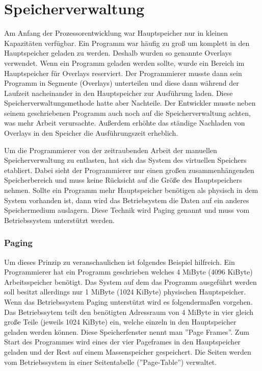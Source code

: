 \documentclass[12pt]{article}
\begin{document}
\section{Speicherverwaltung}
Am Anfang der Prozessorentwicklung war Hauptspeicher nur in kleinen Kapazitäten verfügbar. Ein Programm war häufig zu groß um komplett in den Hauptspeicher geladen zu werden. Deshalb wurden so genannte Overlays verwendet. Wenn ein Programm geladen werden sollte, wurde ein Bereich im Hauptspeicher für Overlays reserviert. Der Programmierer musste dann sein Programm in Segmente (Overlays) unterteilen und diese dann während der Laufzeit nacheinander in den Hauptspeicher zur Ausführung laden. Diese Speicherverwaltungsmethode hatte aber Nachteile. Der Entwickler musste neben seinem geschriebenen Programm auch noch auf die Speicherverwaltung achten, was mehr Arbeit verursachte. Außerdem erhöhte das ständige Nachladen von Overlays in den Speicher die Ausführungszeit erheblich. 



Um die Programmierer von der zeitraubenden Arbeit der manuellen Speicherverwaltung zu entlasten, hat sich das System des virtuellen Speichers etabliert. Dabei sieht der Programmierer nur einen großen zusammenhängenden Speicherbereich und muss keine Rücksicht auf die Größe des Hauptspeichers nehmen. Sollte ein Programm mehr Hauptspeicher benötigen als physisch in dem System vorhanden ist, dann wird das Betriebsystem die Daten auf ein anderes Speichermedium auslagern. Diese Technik wird Paging genannt und muss vom Betriebssystem unterstützt werden.

\subsubsection{Paging}
Um dieses Prinzip zu veranschaulichen ist folgendes Beispiel hilfreich. Ein Programmierer hat ein Programm geschrieben welches 4 MiByte (4096 KiByte) Arbeitsspeicher benötigt. Das System auf dem das Programm ausgeführt werden soll besitzt allerdings nur 1 MiByte (1024 KiByte) physischen Hauptspeicher. Wenn das Betriebssystem Paging unterstützt wird es folgendermaßen vorgehen. Das Betriebssytem teilt den benötigten Adressraum von 4 MiByte in vier gleich große Teile (jeweils 1024 KiByte) ein, welche einzeln in den Hauptspeicher geladen werden können. Diese Speicherfenster nennt man ''Page Frames''. Zum Start des Programmes wird eines der vier Pageframes in den Hauptspeicher geladen und der Rest auf einem Massenspeicher gespeichert. Die Seiten werden vom Betriebssystem in einer Seitentabelle (''Page-Table'') verwaltet. 
\end{document}
